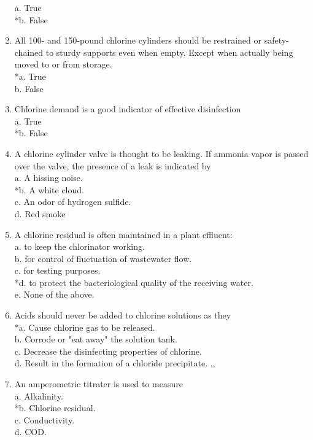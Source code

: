 \begin{enumerate}
a. True \\
*b. False \\
\item All 100- and 150-pound chlorine cylinders should be restrained or safety-chained to sturdy supports even when empty. Except when actually being moved to or from storage.\\
*a. True \\
b. False \\
\item Chlorine demand is a good indicator of effective disinfection\\
a. True \\
*b. False \\
\item A chlorine cylinder valve is thought to be leaking. If ammonia vapor is passed over the valve, the presence of a leak is indicated by \\
a. A hissing noise. \\
*b. A white cloud. \\
c. An odor of hydrogen sulfide. \\
d. Red smoke \\
\item A chlorine residual is often maintained in a plant effluent: \\
a. to keep the chlorinator working. \\
b. for control of fluctuation of wastewater flow. \\
c. for testing purposes. \\
*d. to protect the bacteriological quality of the receiving water. \\
e. None of the above. \\
\item Acids should never be added to chlorine solutions as they \\
*a. Cause chlorine gas to be released. \\
b. Corrode or "eat away" the solution tank. \\
c. Decrease the disinfecting properties of chlorine. \\
d. Result in the formation of a chloride precipitate.
,, \\
\item An amperometric titrater is used to measure \\
a. Alkalinity. \\
*b. Chlorine residual. \\
c. Conductivity. \\
d. COD. \\

\end{enumerate}
